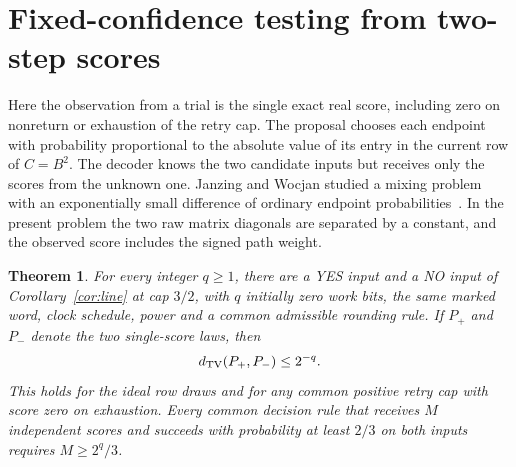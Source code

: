 \documentclass[11pt]{article}
\newtheorem{theorem}{Theorem}
\begin{document}
\section{Fixed-confidence testing from two-step scores}\label{sec:confidence}
Here the observation from a trial is the single exact real score, including zero on nonreturn or exhaustion of the retry cap. The proposal chooses each endpoint with probability proportional to the absolute value of its entry in the current row of \(C=B^2\). The decoder knows the two candidate inputs but receives only the scores from the unknown one. Janzing and Wocjan studied a mixing problem with an exponentially small difference of ordinary endpoint probabilities~\cite{jwmix}. In the present problem the two raw matrix diagonals are separated by a constant, and the observed score includes the signed path weight.

\begin{theorem}\label{thm:confidence}
For every integer \(q\ge1\), there are a YES input and a NO input of Corollary~\ref{cor:line} at cap \(3/2\), with \(q\) initially zero work bits, the same marked word, clock schedule, power and a common admissible rounding rule. If \(P_+\) and \(P_-\) denote the two single-score laws, then
\[
 d_{\rm TV}(P_+,P_-)\le 2^{-q}.
\]
This holds for the ideal row draws and for any common positive retry cap with score zero on exhaustion. Every common decision rule that receives \(M\) independent scores and succeeds with probability at least \(2/3\) on both inputs requires \(M\ge 2^q/3\).
\end{theorem}
\end{document}
